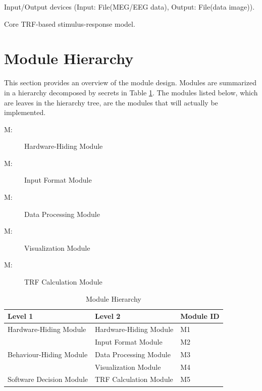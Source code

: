 \documentclass[12pt, titlepage]{article}
\newcounter{ucnum}
\newcommand{\uctheucnum}{UC\theucnum}
\newcounter{mnum}
\newcommand{\mthemnum}{M\themnum}
\begin{document}
\begin{description}
\item[ \uctheucnum \label{ucIO}:] Input/Output devices
  (Input: File(MEG/EEG data), Output: File(data image)).
\item [ \uctheucnum \label{ucCoreTRFmodel}:] Core TRF-based stimulus-response model.
\item
\end{description}

\section{Module Hierarchy} \label{SecMH}

This section provides an overview of the module design. Modules are summarized
in a hierarchy decomposed by secrets in Table \ref{TblMH}. The modules listed
below, which are leaves in the hierarchy tree, are the modules that will
actually be implemented.

\begin{description}
\item [ \mthemnum \label{mHH}:] Hardware-Hiding Module
\item [ \mthemnum \label{m2}:] Input Format Module
\item [ \mthemnum \label{m3}:] Data Processing Module
\item [ \mthemnum \label{m4}:] Visualization Module
\item [ \mthemnum \label{m5}:] TRF Calculation Module
\end{description}

\begin{table}[h!]
\centering
\begin{tabular}{p{} p{}p{}}
\toprule
\textbf{Level 1} & \textbf{Level 2}& \textbf{Module ID}\\
\midrule

{Hardware-Hiding Module} &  Hardware-Hiding Module
 & M1 \\
\midrule

\multirow{3}{0.3\textwidth}{Behaviour-Hiding Module}
& Input Format Module & M2\\
& Data Processing Module & M3\\
& Visualization Module & M4\\

\midrule

\multirow{1}{0.3\textwidth}{Software Decision Module} & TRF Calculation Module & M5\\
\bottomrule

\end{tabular}
\caption{Module Hierarchy}
\label{TblMH}
\end{table}
\end{document}
